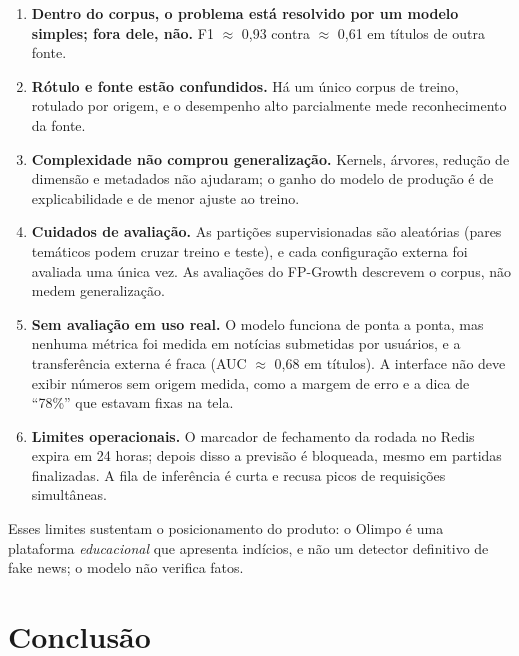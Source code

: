 \documentclass[brazilian,11pt,a4paper]{article}
\begin{document}
\begin{enumerate}
  \item \textbf{Dentro do corpus, o problema está resolvido por um modelo simples; fora dele, não.} F1 $\approx$ 0,93 contra $\approx$ 0,61 em títulos de outra fonte.
  \item \textbf{Rótulo e fonte estão confundidos.} Há um único corpus de treino, rotulado por origem, e o desempenho alto parcialmente mede reconhecimento da fonte.
  \item \textbf{Complexidade não comprou generalização.} Kernels, árvores, redução de dimensão e metadados não ajudaram; o ganho do modelo de produção é de explicabilidade e de menor ajuste ao treino.
  \item \textbf{Cuidados de avaliação.} As partições supervisionadas são aleatórias (pares temáticos podem cruzar treino e teste), e cada configuração externa foi avaliada uma única vez. As avaliações do FP-Growth descrevem o corpus, não medem generalização.
  \item \textbf{Sem avaliação em uso real.} O modelo funciona de ponta a ponta, mas nenhuma métrica foi medida em notícias submetidas por usuários, e a transferência externa é fraca (AUC $\approx$ 0,68 em títulos). A interface não deve exibir números sem origem medida, como a margem de erro e a dica de ``78\%'' que estavam fixas na tela.
  \item \textbf{Limites operacionais.} O marcador de fechamento da rodada no Redis expira em 24 horas; depois disso a previsão é bloqueada, mesmo em partidas finalizadas. A fila de inferência é curta e recusa picos de requisições simultâneas.
\end{enumerate}

Esses limites sustentam o posicionamento do produto: o Olimpo é uma plataforma \emph{educacional} que apresenta indícios, e não um detector definitivo de fake news; o modelo não verifica fatos.

\section{Conclusão}
\end{document}
